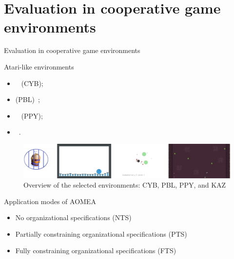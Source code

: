\AtBeginSection[]{
    \begin{frame}
        \frametitle{}
        \tableofcontents[currentsection]
    \end{frame}
}


\section{Evaluation in cooperative game environments}

\begin{frame}{Evaluation in cooperative game environments}

    \begin{block}{Atari-like environments}
        \begin{itemize}
            \item {}~\cite{cage_challenge_3_announcement} (CYB);
            \item {} (PBL)~\cite{Terry2021};
            \item {}~\cite{Lowe2017} (PPY);
            \item {}~\cite{Terry2021}.
        \end{itemize}

        \begin{figure}[H]
            \centering
            \includegraphics[width=0.5\linewidth]{figures/envs_4x1.png}
            \caption{Overview of the selected environments: CYB, PBL, PPY, and KAZ}
            \label{fig:simulated_environments}
        \end{figure}

    \end{block}

    \begin{block}{Application modes of AOMEA}
        \begin{itemize}
            \item No organizational specifications (NTS)
            \item Partially constraining organizational specifications (PTS)
            \item Fully constraining organizational specifications (FTS)
        \end{itemize}
    \end{block}

\end{frame}

